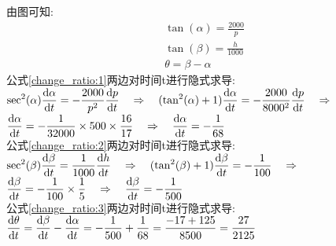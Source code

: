 由图可知:\\
\begin{gather}
\tan(\alpha)=\frac{2000}{p}\label{change_ratio:1}\\
\tan(\beta)=\frac{h}{1000}\label{change_ratio:2}\\
\theta=\beta-\alpha\label{change_ratio:3}
\end{gather}
公式\eqref{change_ratio:1}两边对时间t进行隐式求导:\\[1ex]
$\displaystyle\sec^2(\alpha)\frac{\dif \alpha}{\dif t}=-\frac{2000}{p^2}\frac{\dif p}{\dif t}\quad\Rightarrow\quad(\tan^2(\alpha)+1)\frac{\dif \alpha}{\dif t}=-\frac{2000}{8000^2}\frac{\dif p}{\dif t}\quad\Rightarrow$\\[1ex]
$\displaystyle\frac{\mathop{}\!\mathrm{d} \alpha}{\mathop{}\!\mathrm{d} t}=-\frac{1}{32000}\times 500\times\frac{16}{17}\quad\Rightarrow\quad\frac{\mathop{}\!\mathrm{d} \alpha}{\mathop{}\!\mathrm{d} t}=-\frac{1}{68}$\\[1ex]
公式\eqref{change_ratio:2}两边对时间t进行隐式求导:\\[1ex]
$\displaystyle\sec^2(\beta)\frac{\mathop{}\!\mathrm{d} \beta}{\mathop{}\!\mathrm{d} t}=\frac{1}{1000}\frac{\mathop{}\!\mathrm{d} h}{\mathop{}\!\mathrm{d} t}\quad\Rightarrow\quad(\tan^2(\beta)+1)\frac{\mathop{}\!\mathrm{d} \beta}{\mathop{}\!\mathrm{d} t}=-\frac{1}{100}\quad\Rightarrow$\\[1ex]
$\displaystyle\frac{\mathop{}\!\mathrm{d} \beta}{\mathop{}\!\mathrm{d} t}=-\frac{1}{100}\times\frac{1}{5}\quad\Rightarrow\quad\frac{\mathop{}\!\mathrm{d} \beta}{\mathop{}\!\mathrm{d} t}=-\frac{1}{500}$\\[1ex]
公式\eqref{change_ratio:3}两边对时间t进行隐式求导:\\[1ex]
$\displaystyle\frac{\mathop{}\!\mathrm{d} \theta}{\mathop{}\!\mathrm{d} t}=\frac{\mathop{}\!\mathrm{d} \beta}{\mathop{}\!\mathrm{d} t}-\frac{\mathop{}\!\mathrm{d} \alpha}{\mathop{}\!\mathrm{d} t}=-\frac{1}{500}+\frac{1}{68}=\frac{-17+125}{8500}=\frac{27}{2125}$\\[1ex]
